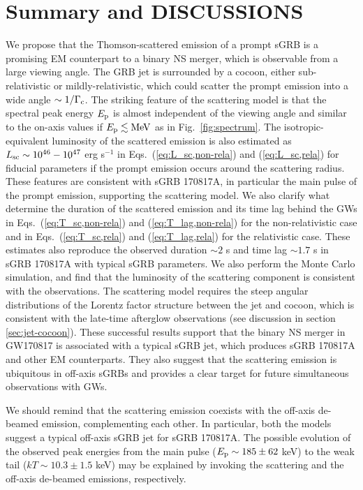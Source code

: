 \documentclass{emulateapj}
\begin{document}
\section{Summary and DISCUSSIONS} 
\label{sec:discussion}

We propose that the Thomson-scattered emission of a prompt sGRB 
is a promising EM counterpart to a binary NS merger,
which is observable from a large viewing angle.
The GRB jet is surrounded by a cocoon, either sub-relativistic or mildly-relativistic,
which could scatter the prompt emission into a wide angle 
$\sim 1/\Gamma_{\rm c}$.
The striking feature of the scattering model is that 
the spectral peak energy $E_{\rm p}$ 
is almost independent of the viewing angle
and similar to the on-axis values if $E_{\rm p} \lesssim {\rm MeV}$ 
as in Fig.~\ref{fig:spectrum}.
The isotropic-equivalent luminosity of the scattered emission
is also estimated as $L_{\rm sc}\sim10^{46}-10^{47}$ erg s$^{-1}$ 
in Eqs.~(\ref{eq:L_sc,non-rela}) and (\ref{eq:L_sc,rela})
for fiducial parameters
if the prompt emission occurs around the scattering radius.
These features are consistent with sGRB 170817A, 
in particular the main pulse of the prompt emission,
supporting the scattering model.
We also clarify what determine
the duration of the scattered emission and its time lag behind the GWs
in Eqs.~(\ref{eq:T_sc,non-rela}) and (\ref{eq:T_lag,non-rela})
for the non-relativistic case
and in Eqs.~(\ref{eq:T_sc,rela}) and (\ref{eq:T_lag,rela})
for the relativistic case.
These estimates also reproduce
the observed duration $\sim 2$ s and time lag $\sim 1.7$ s
in sGRB 170817A with typical sGRB parameters. 
We also perform the Monte Carlo simulation, and find that 
the luminosity of the scattering component is consistent with the observations. 
The scattering model requires the steep angular distributions of 
the Lorentz factor structure between the jet and cocoon, 
which is consistent with the late-time afterglow observations 
(see discussion in section \ref{sec:jet-cocoon}).  
These successful results support that 
the binary NS merger in GW170817 is associated with a typical sGRB jet,
which produces sGRB 170817A and other EM counterparts.
They also suggest that the scattering emission is ubiquitous in off-axis sGRBs
and provides a clear target for future simultaneous observations with GWs.

We should remind that the scattering emission coexists 
with the off-axis de-beamed emission,
complementing each other.
In particular, both the models suggest a typical off-axis sGRB jet for sGRB 170817A.
The possible evolution of the observed peak energies
from the main pulse ($E_{\rm p}\sim 185 \pm 62$ keV) 
to the weak tail ($kT\sim 10.3\pm 1.5$ keV)
may be explained by invoking the scattering and the off-axis de-beamed emissions, respectively.
\end{document}
